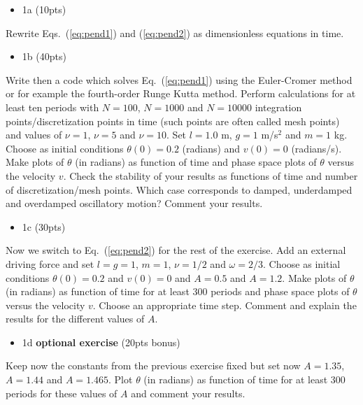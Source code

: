 \documentclass[%
oneside,                 %
final,                   %
10pt]{article}
\begin{document}
\begin{itemize}
\item 1a (10pts)
\end{itemize}

\noindent
Rewrite Eqs.~(\ref{eq:pend1}) and (\ref{eq:pend2}) as dimensionless
equations in time. 

\begin{itemize}
\item 1b (40pts)
\end{itemize}

\noindent
Write then a code which solves Eq.~(\ref{eq:pend1}) using the
Euler-Cromer method or for example the fourth-order Runge Kutta method. Perform
calculations for at least ten periods with $N=100$, $N=1000$ and
$N=10000$ integration points/discretization points in time (such points are often called mesh points) and values of $\nu = 1$, $\nu = 5$ and $\nu
=10$.  Set $l=1.0$ m, $g=1$ m/s$^2$ and $m=1$ kg.  Choose as initial
conditions $\theta(0) = 0.2$ (radians) and $v(0) = 0$ (radians/s).
Make plots of $\theta$ (in radians) as function of time and phase
space plots of $\theta$ versus the velocity $v$.  Check the stability
of your results as functions of time and number of discretization/mesh points.  Which
case corresponds to damped, underdamped and overdamped oscillatory
motion?  Comment your results.

\begin{itemize}
\item 1c (30pts) 
\end{itemize}

\noindent
Now we switch to Eq.~(\ref{eq:pend2}) for the rest of the exercise. Add
an external driving force and set $l=g=1$, $m=1$, $\nu = 1/2$ and
$\omega = 2/3$.  Choose as initial conditions $\theta(0) = 0.2$ and
$v(0) = 0$ and $A=0.5$ and $A=1.2$.  Make plots of $\theta$ (in
radians) as function of time for at least 300 periods and phase space
plots of $\theta$ versus the velocity $v$. Choose an appropriate time
step. Comment and explain the results for the different values of $A$.

\begin{itemize}
\item 1d \textbf{optional exercise} (20pts bonus) 
\end{itemize}

\noindent
Keep now the constants from the previous exercise fixed but
set now $A=1.35$, $A=1.44$ and $A=1.465$. Plot $\theta$ (in radians)
as function of time for at least 300 periods for these values of $A$
and comment your results.
\end{document}
